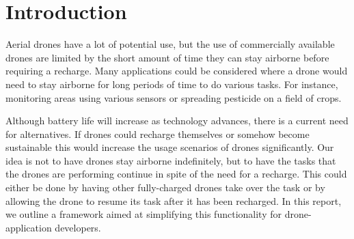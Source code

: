 \section{Introduction}
Aerial drones have a lot of potential use, but the use of commercially available drones are limited by the short amount of time they can stay airborne before requiring a recharge. Many applications could be considered where a drone would need to stay airborne for long periods of time to do various tasks. For instance, monitoring areas using various sensors or spreading pesticide on a field of crops.

Although battery life will increase as technology advances, there is a current need for alternatives. If drones could recharge themselves or somehow become sustainable this would increase the usage scenarios of drones significantly. Our idea is not to have drones stay airborne indefinitely, but to have the tasks that the drones are performing continue in spite of the need for a recharge. This could either be done by having other fully-charged drones take over the task or by allowing the drone to resume its task after it has been recharged. In this report, we outline a framework aimed at simplifying this functionality for drone-application developers.